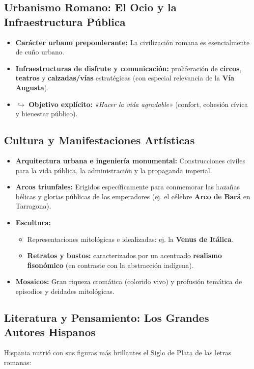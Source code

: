 \documentclass[11pt,letterpaper]{article}
\begin{document}
\subsection{Urbanismo Romano: El Ocio y la Infraestructura Pública}
\begin{itemize}
  \item \textbf{Carácter urbano preponderante:} La civilización romana es esencialmente de cuño urbano.
  \item \textbf{Infraestructuras de disfrute y comunicación:} proliferación de \textbf{circos}, \textbf{teatros} y \textbf{calzadas/vías} estratégicas (con especial relevancia de la \textbf{Vía Augusta}).
  \item $\hookrightarrow$ \textbf{Objetivo explícito:} \textit{«Hacer la vida agradable»} (confort, cohesión cívica y bienestar público).
\end{itemize}

\subsection{Cultura y Manifestaciones Artísticas}
\begin{itemize}
  \item \textbf{Arquitectura urbana e ingeniería monumental:} Construcciones civiles para la vida pública, la administración y la propaganda imperial.
  \item \textbf{Arcos triunfales:} Erigidos específicamente para conmemorar las hazañas bélicas y glorias públicas de los emperadores (ej. el célebre \textbf{Arco de Bará} en Tarragona).
  \item \textbf{Escultura:}
  \begin{itemize}
    \item Representaciones mitológicas e idealizadas: ej. la \textbf{Venus de Itálica}.
    \item \textbf{Retratos y bustos:} caracterizados por un acentuado \textbf{realismo fisonómico} (en contraste con la abstracción indígena).
  \end{itemize}
  \item \textbf{Mosaicos:} Gran riqueza cromática (colorido vivo) y profusión temática de episodios y deidades mitológicas.
\end{itemize}

\subsection{Literatura y Pensamiento: Los Grandes Autores Hispanos}
Hispania nutrió con sus figuras más brillantes el Siglo de Plata de las letras romanas:
\end{document}

